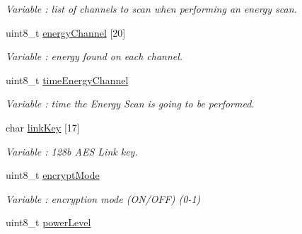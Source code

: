 \begin{DoxyCompactItemize}
\begin{DoxyCompactList}\small\item\em Variable \+: list of channels to scan when performing an energy scan. \end{DoxyCompactList}\item 
uint8\+\_\+t \hyperlink{class_wasp_x_bee_core_a2f9b326decc803c449835f2f290fb2ff}{energy\+Channel} \mbox{[}20\mbox{]}\hypertarget{class_wasp_x_bee_core_a2f9b326decc803c449835f2f290fb2ff}{}\label{class_wasp_x_bee_core_a2f9b326decc803c449835f2f290fb2ff}

\begin{DoxyCompactList}\small\item\em Variable \+: energy found on each channel. \end{DoxyCompactList}\item 
uint8\+\_\+t \hyperlink{class_wasp_x_bee_core_afbf90c5d0b00a43a613280a7ae001861}{time\+Energy\+Channel}\hypertarget{class_wasp_x_bee_core_afbf90c5d0b00a43a613280a7ae001861}{}\label{class_wasp_x_bee_core_afbf90c5d0b00a43a613280a7ae001861}

\begin{DoxyCompactList}\small\item\em Variable \+: time the Energy Scan is going to be performed. \end{DoxyCompactList}\item 
char \hyperlink{class_wasp_x_bee_core_a5a1ef672ddf56a030a202b0efb2a0e09}{link\+Key} \mbox{[}17\mbox{]}\hypertarget{class_wasp_x_bee_core_a5a1ef672ddf56a030a202b0efb2a0e09}{}\label{class_wasp_x_bee_core_a5a1ef672ddf56a030a202b0efb2a0e09}

\begin{DoxyCompactList}\small\item\em Variable \+: 128b A\+ES Link key. \end{DoxyCompactList}\item 
uint8\+\_\+t \hyperlink{class_wasp_x_bee_core_a757e92d34c6c0158773a4f483b9a38e5}{encrypt\+Mode}\hypertarget{class_wasp_x_bee_core_a757e92d34c6c0158773a4f483b9a38e5}{}\label{class_wasp_x_bee_core_a757e92d34c6c0158773a4f483b9a38e5}

\begin{DoxyCompactList}\small\item\em Variable \+: encryption mode (O\+N/\+O\+FF) (0-\/1) \end{DoxyCompactList}\item 
uint8\+\_\+t \hyperlink{class_wasp_x_bee_core_a17d7f5e45fc87c9f3eed52ae43b36d24}{power\+Level}\hypertarget{class_wasp_x_bee_core_a17d7f5e45fc87c9f3eed52ae43b36d24}{}\label{class_wasp_x_bee_core_a17d7f5e45fc87c9f3eed52ae43b36d24}


\end{DoxyCompactItemize}

